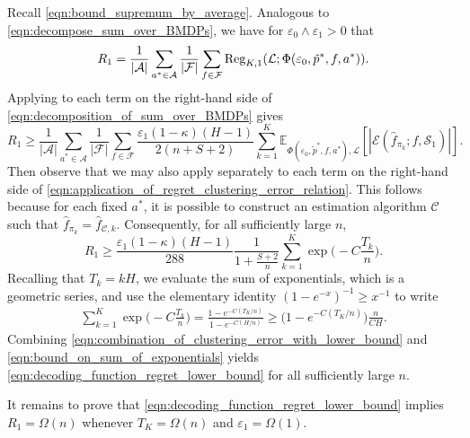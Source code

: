 \documentclass[11pt]{article}
\newcommand{\mcA}{\mathcal{A}}
\newcommand{\mcC}{\mathcal{C}}
\newcommand{\mcE}{\mathcal{E}}
\newcommand{\mcF}{\mathcal{F}}
\newcommand{\mcL}{\mathcal{L}}
\newcommand{\mcS}{\mathcal{S}}
\newcommand{\mbbE}{\mathbb{E}}
\theoremstyle{definition}
\theoremstyle{definition}
\begin{document}
Recall \eqref{eqn:bound_supremum_by_average}.
Analogous to \eqref{eqn:decompose_sum_over_BMDPs}, we have for $\varepsilon_0\wedge\varepsilon_1>0$ that
\begin{equation}
	\label{eqn:decomposition_of_sum_over_BMDPs}
	R_1
	=
	\frac{1}{|\mcA|}\sum_{a^*\in\mcA}
	\frac{1}{|\mcF|}\sum_{f\in\mcF}
	\textnormal{Reg}_{K,1}(\mcL;\Phi(\varepsilon_0,\tilde{p}^*,f,a^*))
	.
\end{equation}
Applying  to each term on the right-hand side of \eqref{eqn:decomposition_of_sum_over_BMDPs} gives
\begin{equation}
	R_1
	\geq
	\frac{1}{|\mcA|}\sum_{a^*\in\mcA}
	\frac{1}{|\mcF|}\sum_{f\in\mcF}
	\frac{\varepsilon_1(1-\kappa)(H-1)}{2(n+S+2)}
	\sum_{k=1}^K\mbbE_{\Phi(\varepsilon_0,\tilde{p}^*,f,a^*),\mcL}[|\mcE(\hat{f}_{\pi_k}; f, \mcS_1)|]
	.
	\label{eqn:application_of_regret_clustering_error_relation}
\end{equation}
Then observe that we may also apply  separately to each term on the right-hand side of \eqref{eqn:application_of_regret_clustering_error_relation}.
This follows because for each fixed $a^*$, it is possible to construct an estimation algorithm $\mcC$ such that $\hat{f}_{\pi_k}=\hat{f}_{\mcC,k}$.
Consequently, for all sufficiently large $n$,
\begin{equation}
	\label{eqn:combination_of_clustering_error_with_lower_bound}
	R_1
	\geq
	\frac{\varepsilon_1(1-\kappa)(H-1)}{288}\frac{1}{1+\frac{S+2}{n}}
	\sum_{k=1}^K
	\exp\biggl(-C\frac{T_k}{n}\biggr)
	.
\end{equation}
Recalling that $T_k=kH$, we evaluate the sum of exponentials, which is a geometric series, and use the elementary identity $(1-e^{-x})^{-1}\geq x^{-1}$ to write
\begin{equation}
	\label{eqn:bound_on_sum_of_exponentials}
	\begin{split}
		\sum_{k=1}^K
		\exp\biggl(
		-C\frac{T_k}{n}
		\biggr)
		=
		\frac{1-e^{-C(T_K/n)}}{1-e^{-C(H/n)}}
		\geq
		\bigl(1-e^{-C(T_K/n)}\bigr)\frac{n}{CH}
		.
	\end{split}
\end{equation}
Combining \eqref{eqn:combination_of_clustering_error_with_lower_bound} and \eqref{eqn:bound_on_sum_of_exponentials} yields \eqref{eqn:decoding_function_regret_lower_bound} for all sufficiently large $n$.

It remains to prove that \eqref{eqn:decoding_function_regret_lower_bound} implies $R_1=\Omega(n)$ whenever $T_K=\Omega(n)$ and $\varepsilon_1=\Omega(1)$.
\end{document}
